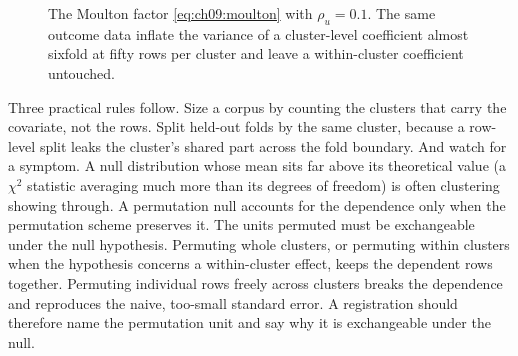 \begin{figure}[tbp]
\centering
{}
\caption{The Moulton factor \eqref{eq:ch09:moulton} with $\rho_u=0.1$. The same outcome data inflate the variance of a cluster-level coefficient almost sixfold at fifty rows per cluster and leave a within-cluster coefficient untouched.}
\label{fig:ch09:moulton}
\end{figure}

Three practical rules follow. Size a corpus by counting the clusters that carry the covariate, not the rows. Split held-out folds by the same cluster, because a row-level split leaks the cluster's shared part across the fold boundary. And watch for a symptom. A null distribution whose mean sits far above its theoretical value (a $\chi^2$ statistic averaging much more than its degrees of freedom) is often clustering showing through. A permutation null accounts for the dependence only when the permutation scheme preserves it. The units permuted must be exchangeable under the null hypothesis. Permuting whole clusters, or permuting within clusters when the hypothesis concerns a within-cluster effect, keeps the dependent rows together. Permuting individual rows freely across clusters breaks the dependence and reproduces the naive, too-small standard error. A registration should therefore name the permutation unit and say why it is exchangeable under the null.


